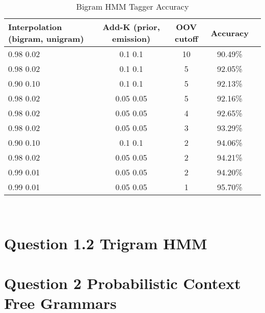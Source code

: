 \documentclass[11pt]{article}
\begin{document}
\begin{table}
	\begin{center}
		\begin{tabular}{l|c|c|c|c|}
		\textbf{Interpolation (bigram, unigram)} & \textbf{Add-K (prior, emission)} & \textbf{OOV cutoff} & \textbf{Accuracy} \\
		\hline
		0.98 0.02 & 0.1 0.1 & 10 & 90.49\% \\
		0.98 0.02 & 0.1 0.1 & 5 & 92.05\% \\
		0.90 0.10 & 0.1 0.1 & 5 & 92.13\%  \\
		0.98 0.02 & 0.05 0.05 & 5 & 92.16\% \\
		0.98 0.02 & 0.05 0.05 & 4 & 92.65\% \\
		0.98 0.02 & 0.05 0.05 & 3 & 93.29\% \\
		0.90 0.10 & 0.1 0.1 & 2 & 94.06\% \\
		0.98 0.02 & 0.05 0.05 & 2 & 94.21\% \\
		0.99 0.01 & 0.05 0.05 & 2 & 94.20\% \\
		0.99 0.01 & 0.05 0.05 & 1 & 95.70\%\\
		\end{tabular}\
		\caption{Bigram HMM Tagger Accuracy}
		\label{tbl:hmm2}
	\end{center}
\end{table}


\section*{Question 1.2 Trigram HMM}

\section*{Question 2 Probabilistic Context Free Grammars}




\end{document}
